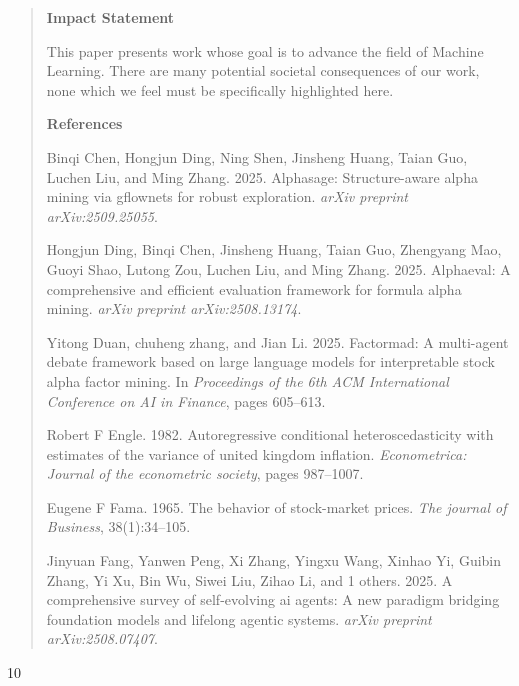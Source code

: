 \documentclass[
]{article}
\begin{document}
\begin{quote}
\textbf{Impact Statement}

This paper presents work whose goal is to advance the field of Machine
Learning. There are many potential societal consequences of our work,
none which we feel must be specifically highlighted here.

\textbf{References}

Binqi Chen, Hongjun Ding, Ning Shen, Jinsheng Huang, Taian Guo, Luchen
Liu, and Ming Zhang. 2025. Alphasage: Structure-aware alpha mining via
gflownets for robust exploration. \emph{arXiv preprint
arXiv:2509.25055}.

Hongjun Ding, Binqi Chen, Jinsheng Huang, Taian Guo, Zhengyang Mao,
Guoyi Shao, Lutong Zou, Luchen Liu, and Ming Zhang. 2025. Alphaeval: A
comprehensive and efficient evaluation framework for formula alpha
mining. \emph{arXiv preprint arXiv:2508.13174}.

Yitong Duan, chuheng zhang, and Jian Li. 2025. Factormad: A multi-agent
debate framework based on large language models for interpretable stock
alpha factor mining. In \emph{Proceedings of the 6th ACM International
Conference on AI in Finance}, pages 605--613.

Robert F Engle. 1982. Autoregressive conditional heteroscedasticity with
estimates of the variance of united kingdom inflation.
\emph{Econometrica: Journal of the econometric society}, pages
987--1007.

Eugene F Fama. 1965. The behavior of stock-market prices. \emph{The
journal of Business}, 38(1):34--105.

Jinyuan Fang, Yanwen Peng, Xi Zhang, Yingxu Wang, Xinhao Yi, Guibin
Zhang, Yi Xu, Bin Wu, Siwei Liu, Zihao Li, and 1 others. 2025. A
comprehensive survey of self-evolving ai agents: A new paradigm bridging
foundation models and lifelong agentic systems. \emph{arXiv preprint
arXiv:2508.07407}.
\end{quote}

10
\end{document}
